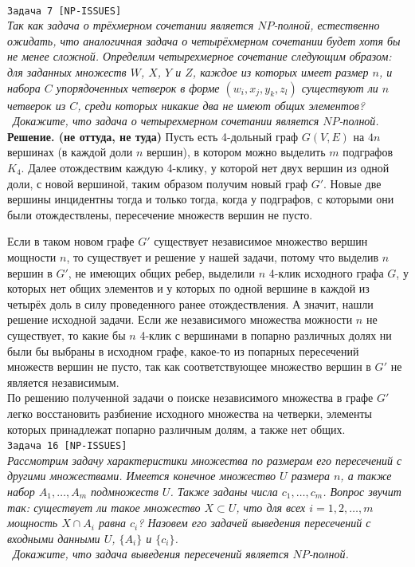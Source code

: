 \documentclass[10pt]{article}
\begin{document}
\ \\[0.5 cm]
{\large\texttt{Задача 7 [NP-ISSUES]}}
\ \\[0.2cm]
\textit{
Так как задача о трёхмерном сочетании является $NP$-полной, естественно ожидать, что аналогичная задача о четырёхмерном сочетании будет хотя бы не менее сложной. Определим четырехмерное сочетание следующим образом: для заданных множеств $W$, $X$, $Y$ и $Z$, каждое из которых имеет размер $n$, и набора $C$ упорядоченных четверок в форме $(w_i, x_j, y_k , z_l)$ существуют ли $n$ четверок из $C$, среди которых никакие два не имеют общих элементов?
\\ \
Докажите, что задача о четырехмерном сочетании является $NP$-полной.
}
\ \\[0.2cm]
\textbf{Решение. (не оттуда, не туда)} Пусть есть 4-дольный граф $G(V,E)$ на $4n$ вершинах (в каждой доли $n$ вершин), в котором можно выделить $m$ подграфов $K_4$. Далее отождествим каждую 4-клику, у которой нет двух вершин из одной доли, с новой вершиной, таким образом получим новый граф $G'$. Новые две вершины инцидентны тогда и только тогда, когда у подграфов, с которыми они были отождествлены, пересечение множеств вершин не пусто.
\medskip\par
Если в таком новом графе $G'$ существует независимое множество вершин мощности $n$, то существует и решение у нашей задачи, потому что выделив $n$ вершин в $G'$, не имеющих общих ребер, выделили $n$ 4-клик исходного графа $G$, у которых нет общих элементов и у которых по одной вершине в каждой из четырёх доль в силу проведенного ранее отождествления. А значит, нашли решение исходной задачи. Если же независимого множества можности $n$ не существует, то какие бы $n$ 4-клик с вершинами в попарно различных долях ни были бы выбраны в исходном графе, какое-то из попарных пересечений множеств вершин не пусто, так как соответствующее множество вершин в $G'$ не является независимым.
\ \\[0.1cm]
По решению полученной задачи о поиске независимого множества в графе $G'$ легко восстановить разбиение исходного множества на четверки, элементы которых принадлежат попарно различным долям, а также нет общих.
\ \\[0.5 cm]
{\large\texttt{Задача 16 [NP-ISSUES]}}
\ \\[0.2cm]
\textit{Рассмотрим задачу характеристики множества по размерам его пересечений
с другими множествами. Имеется конечное множество $U$ размера $n$, а также
набор $A_1, \dots, A_m$ подмножеств $U$. Также заданы числа $c_1, \dots, c_m$. Вопрос звучит так: существует ли такое множество $X\subset U$, что для всех $i = 1, 2, \dots, m$ мощность $X \cap A_i$ равна $c_i$? Назовем его задачей выведения пересечений с входными данными $U$, $\{A_i\}$ и $\{c_i\}$.
\\ \
Докажите, что задача выведения пересечений является $NP$-полной.
}
\end{document}
